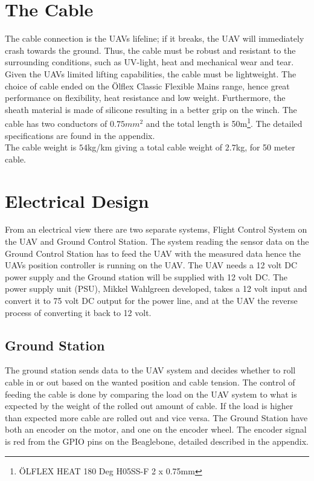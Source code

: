 \section{The Cable}
The cable connection is the UAVs lifeline; if it breaks, the UAV will immediately crash towards the ground. Thus, the cable must be robust and resistant to the surrounding conditions, such as UV-light, heat and mechanical wear and tear.  Given the UAVs limited lifting capabilities, the cable must be lightweight. 
The choice of cable ended on the Ölflex Classic Flexible Mains range, hence great performance on flexibility, heat resistance and low weight. Furthermore, the sheath material is made of silicone resulting in a better grip on the winch. The cable has two conductors of $0.75mm^2$ and the total length is 50m\footnote{ÖLFLEX HEAT 180 Deg H05SS-F 2 x 0.75mm}. The detailed specifications are found in the appendix.\\
The cable weight is $54$kg/km giving a total cable weight of $2.7$kg, for 50 meter cable.


\section{Electrical Design}
From an electrical view there are two separate systems, Flight Control System on the UAV and Ground Control Station. The system reading the sensor data on the Ground Control Station has to feed the UAV with the measured data hence the UAVs position controller is running on the UAV. 
The UAV needs a 12 volt DC power supply and the Ground station will be supplied with 12 volt DC. The power supply unit (PSU), Mikkel Wahlgreen developed, takes a 12 volt input and convert it to 75 volt DC output for the power line, and at the UAV the reverse process of converting it back to 12 volt.

\subsection{Ground Station}
The ground station sends data to the UAV system and decides whether to roll cable in or out based on the wanted position and cable tension. The control of feeding the cable is done by comparing the load on the UAV system to what is expected by the weight of the rolled out amount of cable. If the load is higher than expected more cable are rolled out and vice versa. The Ground Station have both an encoder on the motor, and one on the encoder wheel. The encoder signal is red from the GPIO pins on the Beaglebone, detailed described in the appendix.
  
